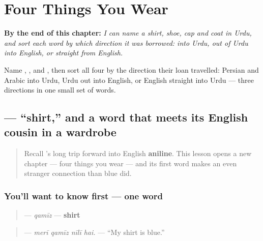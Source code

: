 
\chapter{Four Things You Wear}
\label{ch:ur-clothing}

\begin{chapteropening}
\textbf{By the end of this chapter:} \emph{I can name a shirt, shoe, cap and coat in Urdu, and sort each word by which direction it was borrowed: into Urdu, out of Urdu into English, or straight from English.}

Name , ,  and , then sort all four by the direction their loan travelled: Persian and Arabic into Urdu, Urdu out into English, or English straight into Urdu — three directions in one small set of words.
\end{chapteropening}

\section[\texorpdfstring{\ur{قمیض} (qamīz)}{قمیض (qamīz)}]{ — \textquotedblleft{}shirt,\textquotedblright{} and a word that meets its English cousin in a wardrobe}

\label{lesson:UR-C14-qamiz}



\begin{quote}
Recall \textbf{}'s long trip forward into English \textbf{aniline}. This lesson opens a new chapter — four things you wear — and its first word makes an even stranger connection than blue did.
\end{quote}

\subsection*{You'll want to know first — one word}
\begin{quote}
\textbf{} — \emph{qamīz} — \textbf{shirt}
\end{quote}

\begin{quote}
\textbf{   } — \emph{merī qamīz nīlī hai.} — \textquotedblleft{}My shirt is blue.\textquotedblright{}
\end{quote}

